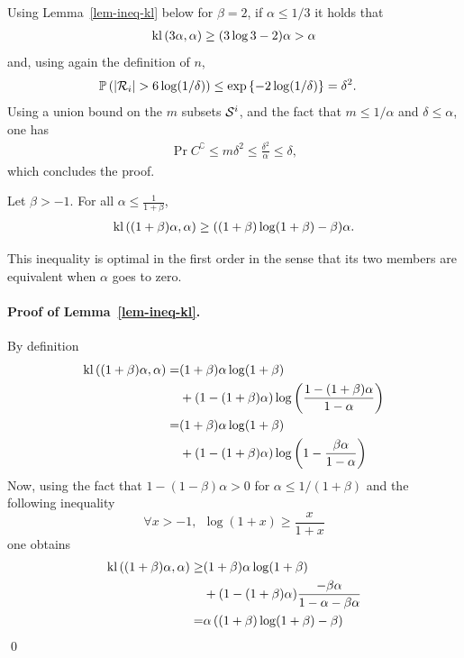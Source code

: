 Using Lemma~\ref{lem-ineq-kl} below for $\beta=2$, if $\alpha \leq 1/3$ it holds that
\begin{align*}
\operatorname{kl}\left( 3\alpha, \alpha \right) \geq (3\log 3 - 2)\alpha > \alpha
\end{align*}
and, using again the definition of $n$,
\begin{align*}
 &\mathbb{P}\left(  |\mathcal{R}_i| > 6 \log(1/\delta)  \right)
 	\leq \exp\left\{- 2 \log(1/\delta)\right\}
 	= \delta^2.
\end{align*}
Using a union bound on the $m$ subsets $\mathcal{S}^{i}$, and the fact that $m \leq 1/\alpha$ and $\delta \leq \alpha$, one has 
\begin{align*}
\Pr{ C^\complement }
	\leq m \delta^2
	\leq \frac{\delta^2}{\alpha}
	\leq \delta,
\end{align*}
which concludes the proof.

\begin{lemma}\label{lem-ineq-kl} Let $\beta > -1$. For all $\alpha \leq \frac{1}{1+\beta}$, 
\begin{align*}
\operatorname{kl}\left( (1+\beta)\alpha, \alpha \right)
	\geq ((1+\beta)\log(1+\beta) - \beta) \alpha.
\end{align*}
\end{lemma}

This inequality is optimal in the first order in the sense that its two members are equivalent when $\alpha$ goes to zero.

\paragraph{Proof of Lemma~\ref{lem-ineq-kl}.} By definition
\begin{align*}
 \operatorname{kl}\left( (1+\beta)\alpha, \alpha \right)
 	=& (1+\beta)\alpha\log(1+\beta) \\
 & + (1-(1+\beta)\alpha)\log\left(\frac{1-(1+\beta)\alpha}{1-\alpha}\right) \\
 =& (1+\beta)\alpha\log(1+\beta) \\
  &  +  (1-(1+\beta)\alpha)\log\left(1 - \frac{\beta\alpha}{1-\alpha}\right) 
\end{align*}
Now, using the fact that $1 - (1-\beta)\alpha >0$ for $\alpha \leq 1/(1+\beta)$ and the following inequality 
\[\forall x > -1, \ \ \log(1+x) \geq \frac{x}{1+x}\]
one obtains 
\begin{align*}
	\operatorname{kl}\left( (1+\beta)\alpha, \alpha \right)
		\geq & (1+\beta)\alpha\log(1+\beta)
\\
   &  +  (1-(1+\beta)\alpha)\frac{-\beta\alpha}{1-\alpha - \beta\alpha}
\\
  = & \alpha \left((1+\beta)\log(1+\beta) - \beta\right)
\end{align*}
\qed


